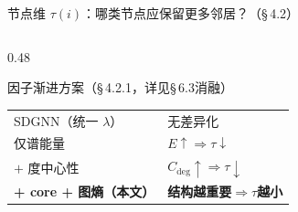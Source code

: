 \documentclass[aspectratio=169,9pt,xcolor=dvipsnames]{beamer}
\begin{document}
\begin{frame}{节点维 $\tau(i)$：哪类节点应保留更多邻居？（§\,4.2）}
\begin{columns}[T]
\begin{column}{0.48\textwidth}
  \begin{block}{因子渐进方案（§\,4.2.1，详见§\,6.3消融）}
    \small
    \begin{tabular}{ll}
      SDGNN（统一 $\lambda$） & 无差异化 \\
      仅谱能量 & $E\uparrow\Rightarrow\tau\downarrow$ \\
      $+$ 度中心性 & $C_{\mathrm{deg}}\uparrow\Rightarrow\tau\downarrow$ \\
      \textbf{+ core + 图熵（本文）} & \textbf{结构越重要$\Rightarrow\tau$越小} \\
    \end{tabular}
  \end{block}
\end{column}
\end{columns}
\end{frame}
\end{document}
